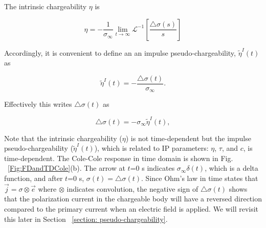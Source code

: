 \documentclass[extra,mreferee]{gji}
\newcommand{\siginf}{\sigma_\infty}
\newcommand{\dsig}{\triangle\sigma}
\renewcommand {\j}  { {\vec j} }
\newcommand {\e}  { {\vec e} }
\newcommand{\peta}{\tilde{\eta}}
\begin{document}
The intrinsic chargeability $\eta$ is 
\begin{linenomath*}
\begin{equation}
  \eta= -\frac{1}{\siginf} \lim_{t \to \infty}\mathscr{L}^{-1}[\frac{\dsig(s)}{s}]
\end{equation}
\end{linenomath*}
Accordingly, it is convenient to define an an impulse pseudo-chargeability, $\peta^{I}(t)$ as
\begin{linenomath*}
\begin{equation}
    \peta^{I}(t) = -\frac{\dsig(t)}{\siginf}. %
    \label{eq: intrinsic_peta}
\end{equation}
\end{linenomath*}
Effectively this writes $\dsig(t)$ as 
\begin{linenomath*}
\begin{equation}
  \dsig(t) = - \siginf\peta^{I}(t),
  \label{eq: sigma_time_c1}
\end{equation}
\end{linenomath*}
Note that the intrinsic chargeability ($\eta$) is not time-dependent but the impulse pseudo-chargeability ($\peta^{I}(t)$), which is related to IP parameters: $\eta$, $\tau$, and $c$,  is  time-dependent.
The Cole-Cole response in time domain is shown in Fig. ~\ref{Fig:FDandTDCole}(b). The arrow at $t$=0 s indicates $\siginf \delta(t)$, which is a delta function, and after $t$=0 s, $\sigma (t) = \dsig(t)$. Since Ohm's law in time states that $\j=\sigma \otimes \e$ where $\otimes$ indicates convolution, the negative sign of $\dsig(t)$ shows that the polarization current in the chargeable body will have a reversed direction compared to the primary current when an electric field is applied. We will revisit this later in Section ~\ref{section: pseudo-chargeability}. 

\end{document}
